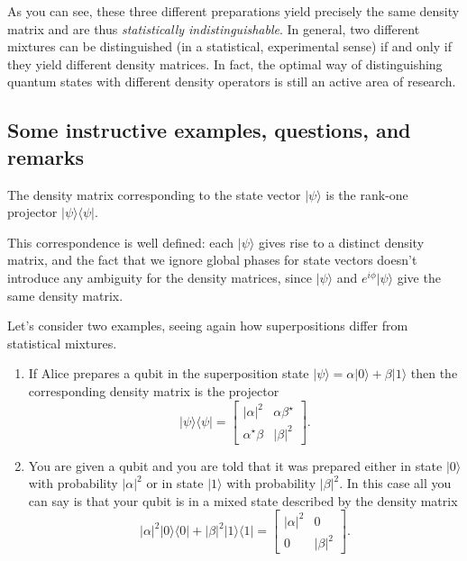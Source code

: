 \documentclass[fleqn]{article}
\newenvironment{idea}{\noindent}{\medskip}
\begin{document}
As you can see, these three different preparations yield precisely the same density matrix and are thus \emph{statistically indistinguishable}.
In general, two different mixtures can be distinguished (in a statistical, experimental sense) if and only if they yield different density matrices.
In fact, the optimal way of distinguishing quantum states with different density operators is still an active area of research.

\hypertarget{some-instructive-examples-questions-and-remarks}{%
\subsection{Some instructive examples, questions, and remarks}\label{some-instructive-examples-questions-and-remarks}}

\begin{idea}
The density matrix corresponding to the state vector \(|\psi\rangle\) is the rank-one projector \(|\psi\rangle\langle\psi|\).

\end{idea}

This correspondence is well defined: each \(|\psi\rangle\) gives rise to a distinct density matrix, and the fact that we ignore global phases for state vectors doesn't introduce any ambiguity for the density matrices, since \(|\psi\rangle\) and \(e^{i\phi}|\psi\rangle\) give the same density matrix.

Let's consider two examples, seeing again how superpositions differ from statistical mixtures.

\begin{enumerate}
\def\labelenumi{\arabic{enumi}.}
\item
  If Alice prepares a qubit in the superposition state \(|\psi\rangle = \alpha|0\rangle + \beta|1\rangle\) then the corresponding density matrix is the projector
  \[
     |\psi\rangle\langle\psi|
     = \begin{bmatrix}
       |\alpha|^2 & \alpha\beta^\star
     \\\alpha^\star\beta & |\beta|^2
     \end{bmatrix}.
   \]
\item
  You are given a qubit and you are told that it was prepared either in state \(|0\rangle\) with probability \(|\alpha|^2\) or in state \(|1\rangle\) with probability \(|\beta|^2\).
  In this case all you can say is that your qubit is in a mixed state described by the density matrix
  \[
     |\alpha|^2|0\rangle\langle 0| + |\beta|^2|1\rangle\langle 1|
     = \begin{bmatrix}
       |\alpha|^2 & 0
     \\0 & |\beta|^2
     \end{bmatrix}.
   \]
\end{enumerate}
\end{document}
